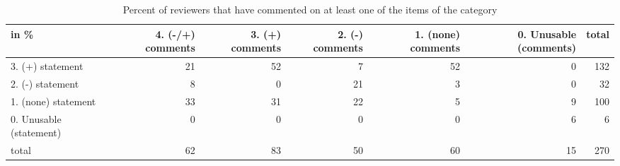 \documentclass{article}
\begin{document}
\begin{table}[H]

\centering

\begin{tabular}{lrrrrrr}
\hline
 in \%                    &   4. (-/+) comments &   3. (+) comments &   2. (-) comments &   1. (none) comments &   0. Unusable (comments) &   total \\
\hline
 3. (+) statement        &                  21 &                52 &                 7 &                   52 &                        0 &     132 \\
 2. (-) statement        &                   8 &                 0 &                21 &                    3 &                        0 &      32 \\
 1. (none) statement     &                  33 &                31 &                22 &                    5 &                        9 &     100 \\
 0. Unusable (statement) &                   0 &                 0 &                 0 &                    0 &                        6 &       6 \\
 total                   &                  62 &                83 &                50 &                   60 &                       15 &     270 \\
\hline
\end{tabular}\caption{Percent of reviewers that have commented on at least one of the items of the category}

\end{table}
\end{document}
